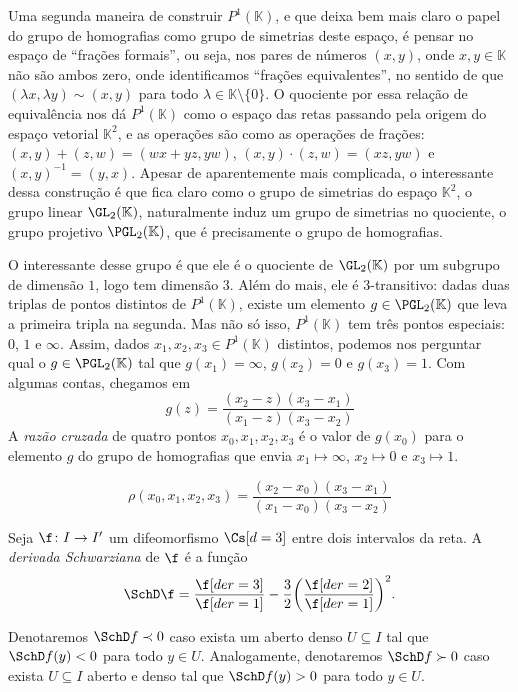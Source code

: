 \documentclass[../fapesp0]{subfiles}
\begin{document}
Uma segunda maneira de construir \(P^1(\mathbb{K})\), e que deixa bem mais claro o papel do grupo de homografias como grupo de simetrias deste espaço, é pensar no espaço de ``frações formais'', ou seja, nos pares de números \((x,y)\), onde \(x, y \in \mathbb{K}\) não são ambos zero, onde identificamos ``frações equivalentes'', no sentido de que \((\lambda x, \lambda y) \sim (x, y)\) para todo \(\lambda \in \mathbb{K} \setminus \{ 0 \}\). O quociente por essa relação de equivalência nos dá \(P^1(\mathbb{K})\) como o espaço das retas passando pela origem do espaço vetorial \(\mathbb{K}^2\), e as operações são como as operações de frações: \((x,y) + (z,w) = (wx + yz, yw)\), \((x,y) \cdot (z,w) = (xz, yw)\) e \((x,y)^{-1} = (y,x)\). Apesar de aparentemente mais complicada, o interessante dessa construção é que fica claro como o grupo de simetrias do espaço \(\mathbb{K}^2\), o grupo linear \(\GL_2(\mathbb{K})\), naturalmente induz um grupo de simetrias no quociente, o grupo projetivo \(\PGL_2(\mathbb{K})\), que é precisamente o grupo de homografias.

O interessante desse grupo é que ele é o quociente de \(\GL_2(\mathbb{K})\) por um subgrupo de dimensão \(1\), logo tem dimensão \(3\). Além do mais, ele é \(3\)-transitivo: dadas duas triplas de pontos distintos de \(P^1(\mathbb{K})\), existe um elemento \(g \in \PGL_2(\mathbb{K})\) que leva a primeira tripla na segunda. Mas não só isso, \(P^1(\mathbb{K})\) tem três pontos especiais: \(0\), \(1\) e \(\infty\). Assim, dados \(x_1,x_2, x_3 \in P^1(\mathbb{K})\) distintos, podemos nos perguntar qual o \(g \in \PGL_2(\mathbb{K})\) tal que \(g(x_1) = \infty\), \(g(x_2) = 0\) e \(g(x_3) = 1\). Com algumas contas, chegamos em 
\begin{equation*}
  g(z) = \frac{(x_2 - z)(x_3 - x_1)}{(x_1 - z)(x_3 - x_2)}
\end{equation*}
A \emph{razão cruzada} de quatro pontos \(x_{0},x_1,x_2,x_3\) é o valor de \(g(x_0)\) para o elemento \(g\) do grupo de homografias que envia \(x_1 \mapsto \infty\), \(x_2 \mapsto 0\) e \(x_3 \mapsto 1\).
\begin{definition}
  \begin{equation*}
    \rho(x_0,x_1,x_2,x_3) = \frac{(x_2 - x_0)(x_3 - x_1)}{(x_1 - x_0)(x_3 - x_2)}
  \end{equation*}
\end{definition}

\NewObject\IFunOp{}
\begin{definition}

  Seja \(\f \colon I \to I'\) um difeomorfismo \(\Cs[d = 3]\) entre dois intervalos da reta.
  A \emph{derivada Schwarziana} de \(\f\) é a função
  \begin{equation*}
    \SchD\f = \frac{\f[der = 3]}{\f[der = 1]} - \frac{3}{2}\rpar*{\frac{\f[der = 2]}{\f[der = 1]}}^2.
  \end{equation*}
\end{definition}
Denotaremos \(\SchD f \prec 0\) caso exista um aberto denso \(U \subseteq I\) tal que \(\SchD f(y) < 0\) para todo \(y \in U\). Analogamente, denotaremos \(\SchD f \succ 0\) caso exista \(U \subseteq I\) aberto e denso tal que \(\SchD f(y) > 0\) para todo \(y \in U\).
\end{document}
